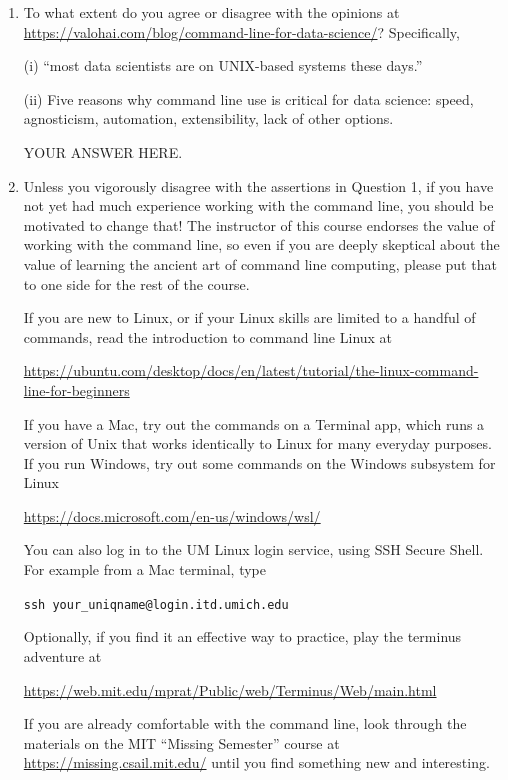 \documentclass[12pt]{article}
\begin{document}
\begin{enumerate}
  
\item To what extent do you agree or disagree with the opinions at
\url{https://valohai.com/blog/command-line-for-data-science/}?
Specifically,

(i) ``most data scientists are on UNIX-based systems these days.''

(ii) Five reasons why command line use is critical for data science: speed, agnosticism, automation, extensibility, lack of other options.


YOUR ANSWER HERE.

\item  Unless you vigorously disagree with the assertions in Question 1, if you have not yet had much experience working with the command line, you should be motivated to change that! The instructor of this course endorses the value of working with the command line, so even if you are deeply skeptical about the value of learning the ancient art of command line computing, please put that to one side for the rest of the course.

If you are new to Linux, or if your Linux skills are limited to a handful of commands, read the introduction to command line Linux at

{\small\hspace{-1cm}\url{https://ubuntu.com/desktop/docs/en/latest/tutorial/the-linux-command-line-for-beginners}}

If you have a Mac, try out the commands on a Terminal app, which runs a version of Unix that works identically to Linux for many everyday purposes. If you run Windows, try out some commands on the Windows subsystem for Linux

\url{https://docs.microsoft.com/en-us/windows/wsl/}

You can also log in to the UM Linux login service, using SSH Secure Shell. For example from a Mac terminal, type

\texttt{ssh your\_uniqname@login.itd.umich.edu}

Optionally, if you find it an effective way to practice, play the terminus adventure at

\url{https://web.mit.edu/mprat/Public/web/Terminus/Web/main.html}

If you are already comfortable with the command line, look through the materials on the MIT ``Missing Semester'' course at \url{https://missing.csail.mit.edu/} until you find something new and interesting.


\end{enumerate}
\end{document}
